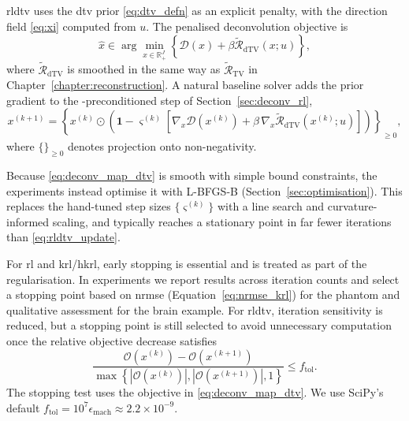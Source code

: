 \gls{rldtv} uses the \gls{dtv} prior \eqref{eq:dtv_defn} \cite{ehrhardtPETReconstructionAnatomical2016} as an explicit penalty, with the direction field \eqref{eq:xi} computed from $u$. The penalised deconvolution objective is
\begin{equation}
    \hat x
    \in
    \arg\min_{x\in\mathbb{R}^J_+}
    \left\{
        \mathcal{D}(x) + \beta \widetilde{\mathcal{R}}_{\mathrm{dTV}}(x;u)
    \right\},
    \label{eq:deconv_map_dtv}
\end{equation}
where $\widetilde{\mathcal{R}}_{\mathrm{dTV}}$ is smoothed in the same way as $\widetilde{\mathcal{R}}_{\mathrm{TV}}$ in Chapter~\ref{chapter:reconstruction}. A natural baseline solver adds the prior gradient to the -preconditioned step of Section~\ref{sec:deconv_rl},
\begin{equation}
    x^{(k+1)}
    =
    \left\{
        x^{(k)}\odot\left(\mathbf{1}
        -
        \varsigma^{(k)}
        \left[
            \nabla_x\mathcal{D}(x^{(k)}) + \beta\,\nabla_x \widetilde{\mathcal{R}}_{\mathrm{dTV}}(x^{(k)};u)
        \right]\right)
    \right\}_{\geq 0},
    \label{eq:rldtv_update}
\end{equation}
where $\{\}_{\geq0}$ denotes projection onto non-negativity.

Because \eqref{eq:deconv_map_dtv} is smooth with simple bound constraints, the experiments instead optimise it with L-BFGS-B (Section~\ref{sec:optimisation}). This replaces the hand-tuned step sizes $\{\varsigma^{(k)}\}$ with a line search and curvature-informed scaling, and typically reaches a stationary point in far fewer iterations than \eqref{eq:rldtv_update}.

For \gls{rl} and \gls{krl}/\gls{hkrl}, early stopping is essential and is treated as part of the regularisation. In experiments we report results across iteration counts and select a stopping point based on \gls{nrmse} (Equation~\ref{eq:nrmse_krl}) for the phantom and qualitative assessment for the brain example. For \gls{rldtv}, iteration sensitivity is reduced, but a stopping point is still selected to avoid unnecessary computation once the relative objective decrease satisfies
\begin{equation}
    \frac{
        \mathcal{O}(x^{(k)}) - \mathcal{O}(x^{(k+1)})
    }{
        \max\left\{\left|\mathcal{O}(x^{(k)})\right|,
        \left|\mathcal{O}(x^{(k+1)})\right|,1\right\}
    }
    \leq f_{\mathrm{tol}}.
\end{equation}
The stopping test uses the objective in \eqref{eq:deconv_map_dtv}. We use SciPy's default $f_{\mathrm{tol}}=10^{7}\epsilon_{\mathrm{mach}}\approx2.2\times10^{-9}$.

